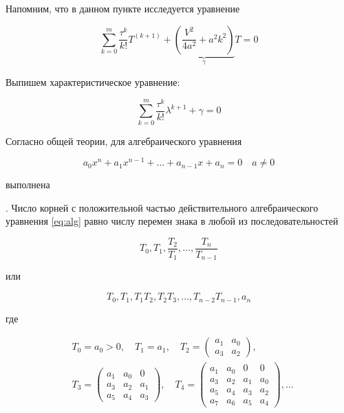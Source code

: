 Напомним, что в данном пункте исследуется уравнение 

\begin{equation*}
\sum\limits_{k=0}^{m} \dfrac{\tau^k}{k!} T^{(k+1)} + \underbrace{ \left( \dfrac{V^2}{4a^2} + a^2 k^2 \right)}_{\gamma} T = 0
\end{equation*}

Выпишем характеристическое уравнение:

\begin{equation*}
\sum\limits_{k=0}^{m} \dfrac{\tau^k}{k!} \lambda^{k+1} + {\gamma} = 0
\end{equation*}

Согласно общей теории, для алгебраического уравнения

\begin{equation}\label{eq:alg}
a_0 x^n + a_1 x^{n-1} + \dots + a_{n-1} x + a_n = 0 \quad a \neq 0
\end{equation}

выполнена

. Число корней с положительной частью действительного алгебраического уравнения \ref{eq:alg} равно числу перемен знака в любой из последовательностей

\begin{equation*}
T_0, T_1, \dfrac{T_2}{T_1}, \dots, \dfrac{T_n}{T_{n-1}}
\end{equation*}

или

\begin{equation*}
T_0, T_1, T_1 T_2, T_2 T_3, \dots, T_{n-2} T_{n-1}, a_n
\end{equation*}

где

\begin{align*}
& T_0 = a_0 > 0, \quad T_1 = a_1, \quad T_2 = 
\begin{pmatrix}
a_1 & a_0\\
a_3 & a_2
\end{pmatrix},\\
& T_3 = 
\begin{pmatrix}
a_1 & a_0 & 0\\
a_3 & a_2 &a_1\\
a_5 & a_4 &a_3
\end{pmatrix}, \quad T_4 =
\begin{pmatrix}
a_1 & a_0 & 0 & 0\\
a_3 & a_2 & a_1 & a_0\\
a_5 & a_4 & a_3 & a_2\\
a_7 & a_6 & a_5 & a_4
\end{pmatrix}, \dots
\end{align*}

